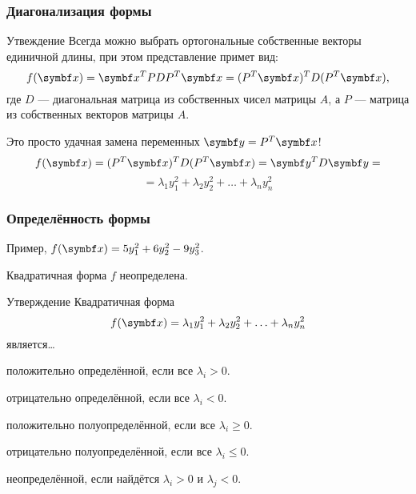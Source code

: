 \begin{frame}
    \frametitle{Диагонализация формы}
\begin{block}{Утвеждение}
    Всегда можно выбрать ортогональные собственные векторы единичной длины, 
    при этом представление примет вид:
    \[
    f(\bx) = \bx^T PDP^T \bx = (P^T \bx)^T D (P^T \bx),    
    \] 
    где $D$ — диагональная матрица из собственных чисел матрицы $A$, 
    а $P$ — матрица из собственных векторов матрицы $A$.
\end{block}
    \pause
    Это просто удачная замена переменных $\by=P^T \bx$!\pause
    \[
    f(\bx) =  (P^T \bx)^T D (P^T \bx) = \by^T D \by = 
    \]
    \[
    = \lambda_1 y_1^2 + \lambda_2 y_2^2 + \ldots + \lambda_n y_n^2
    \]
\end{frame}

\begin{frame}
    \frametitle{Определённость формы}
    Пример, $f(\bx) = 5 y_1^2 + 6y_2^2 - 9y_3^2$. \pause

    Квадратичная форма $f$ неопределена. 
    \pause
\begin{block}{Утверждение}
    Квадратичная форма 
    \[
      f(\bx) = \lambda_1 y_1^2 + \lambda_2 y_2^2 + \ldots + \lambda_n y_n^2  
    \]
    является\ldots\pause 

    положительно определённой, если все $\lambda_i >0$.\pause

    отрицательно определённой, если все $\lambda_i <0$.\pause

    положительно полуопределённой, если все $\lambda_i \geq 0$.\pause

    отрицательно полуопределённой, если все $\lambda_i \leq 0$.\pause

    неопределённой, если найдётся $\lambda_i >0$ и $\lambda_j < 0$.
\end{block}

\end{frame}

